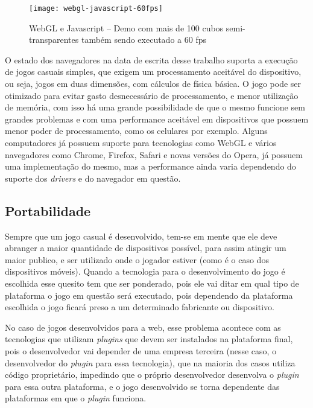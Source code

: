 \begin{figure}[H]
  \centering
	\texttt{[image: webgl-javascript-60fps]}
  \caption{WebGL e Javascript {--} Demo com mais de 100 cubos
  semi-transparentes também sendo executado a 60 fps}
  \label{img:webgl-javascript-60fps}
\end{figure}

O estado dos navegadores na data de escrita desse
trabalho suporta a execução de jogos casuais simples, que exigem
um processamento aceitável do dispositivo, ou seja, jogos em duas
dimensões, com cálculos de física básica. O jogo pode ser otimizado
para evitar gasto desnecessário de processamento, e menor utilização
de memória, com isso há uma grande possibilidade de que o mesmo
funcione sem grandes problemas e com uma performance aceitável em dispositivos
que possuem menor poder de processamento, como os celulares por exemplo.
Alguns computadores já possuem suporte para tecnologias como WebGL e
vários navegadores como Chrome, Firefox, Safari e novas versões do
Opera, já possuem uma implementação do mesmo, mas a performance ainda
varia dependendo do suporte dos \textit{drivers} e do navegador em
questão.

\subsection{Portabilidade}

Sempre que um jogo casual é desenvolvido, tem-se em mente que ele deve
abranger a maior quantidade de dispositivos possível, para assim
atingir um maior publico, e ser utilizado onde o jogador estiver (como
é o caso dos dispositivos móveis). Quando a tecnologia para o
desenvolvimento do jogo é escolhida esse quesito tem que ser
ponderado, pois ele vai ditar em qual tipo de plataforma o jogo em
questão será executado, pois dependendo da plataforma escolhida o jogo ficará preso
a um determinado fabricante ou dispositivo.

No caso de jogos desenvolvidos para a web, esse problema acontece com as
tecnologias que utilizam \textit{plugins} que devem ser instalados na
plataforma final, pois o desenvolvedor vai depender de uma empresa
terceira (nesse caso, o desenvolvedor do \textit{plugin} para essa tecnologia),
que na maioria dos casos utiliza código proprietário, impedindo que o
próprio desenvolvedor desenvolva o \textit{plugin} para essa outra plataforma,
e o jogo desenvolvido se torna dependente das plataformas em que o
\textit{plugin}
funciona.

